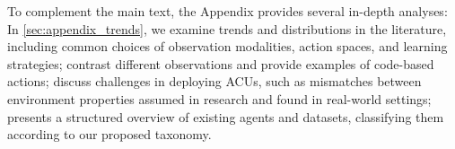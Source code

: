 To complement the main text, the Appendix provides several in-depth analyses:
In \cref{sec:appendix_trends}, we examine trends and distributions in the literature, including common choices of observation modalities, action spaces, and learning strategies;
 contrast different observations and provide examples of code-based actions;
 discuss challenges in deploying ACUs, such as mismatches between environment properties assumed in research and found in real-world settings;
 presents a structured overview of existing agents and datasets, classifying them according to our proposed taxonomy.